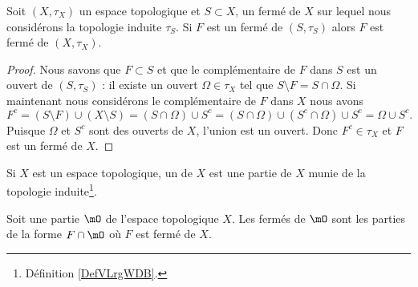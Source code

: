 \begin{lemma}        \label{LemBWSUooCCGvax}
	Soit \( (X,\tau_X)\) un espace topologique et \( S\subset X\), un fermé de \( X\) sur lequel nous considérons la topologie induite \( \tau_S\). Si \( F\) est un fermé de \( (S,\tau_S)\) alors \( F\) est fermé de \( (X,\tau_X)\).
\end{lemma}

\begin{proof}
	Nous savons que \( F\subset S\) et que le complémentaire de \( F\) dans \( S\) est un ouvert de \( (S,\tau_S)\) : il existe un ouvert \( \Omega\in \tau_X\) tel que \( S\setminus F=S\cap \Omega\). Si maintenant nous considérons le complémentaire de \( F\) dans \( X\) nous avons
	\begin{equation}
		F^c=(S\setminus F)\cup (X\setminus S)=(S\cap \Omega)\cup S^c=(S\cap \Omega)\cup(S^c\cap \Omega)\cup S^c=\Omega\cup S^c.
	\end{equation}
	Puisque \( \Omega\) et \( S^c\) sont des ouverts de \( X\), l'union est un ouvert. Donc \( F^c\in \tau_X\) et \( F\) est un fermé de \( X\).
\end{proof}

\begin{definition}	\label{DEFooEXHFooKlKcQD}
	Si \( X\) est un espace topologique, un  de \( X\) est une partie de \( X\) munie de la topologie induite\footnote{Définition \ref{DefVLrgWDB}.}.
\end{definition}



\begin{proposition}	\label{PROPooQFIMooYmgjhA}
	Soit une partie \( \mO\) de l'espace topologique \( X\). Les fermés de \( \mO\) sont les parties de la forme \( F\cap \mO\) où \( F\) est fermé de \( X\).
\end{proposition}

